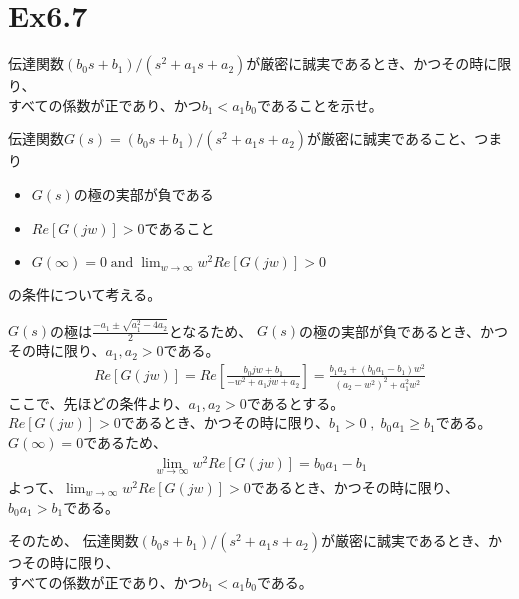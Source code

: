 \documentclass{jsarticle}
\begin{document}

\section*{Ex6.7}
伝達関数$(b_0s + b_1)/(s^2 + a_1s + a_2)$が厳密に誠実であるとき、かつその時に限り、\\
すべての係数が正であり、かつ$b_1 <a_1b_0$であることを示せ。

\vspace{1cm}
伝達関数$G(s) = (b_0s + b_1)/(s^2 + a_1s + a_2)$が厳密に誠実であること、つまり
\begin{itemize}
  \item $G(s)$の極の実部が負である
  \item $Re[G(jw)]>0$であること
  \item $G(\infty) = 0 \;\text{and}\;\lim_{w\rightarrow \infty}w^2Re[G(jw)]>0$
\end{itemize}
の条件について考える。

$G(s)$の極は$\frac{-a_1 \pm\sqrt{a_1^2-4a_2}}{2}$となるため、
$G(s)$の極の実部が負であるとき、かつその時に限り、$a_1,a_2 > 0$である。
\begin{align*}
  Re[G(jw)] = Re\left[\frac{b_0jw + b_1}{-w^2 + a_1jw + a_2}\right]=\frac{b_1a_2 + (b_0a_1 - b_1)w^2}{(a_2-w^2)^2+a_1^2w^2}
\end{align*}
ここで、先ほどの条件より、$a_1,a_2 > 0$であるとする。\\
$Re[G(jw)]>0$であるとき、かつその時に限り、$b_1>0\;,\;b_0a_1 \geq b_1$である。
$G(\infty) = 0$であるため、
\begin{align*}
  \lim_{w\rightarrow \infty}w^2Re[G(jw)]= b_0a_1-b_1 
\end{align*}
よって、$\lim_{w\rightarrow \infty}w^2Re[G(jw)]>0$であるとき、かつその時に限り、$b_0a_1 > b_1$である。

そのため、
伝達関数$(b_0s + b_1)/(s^2 + a_1s + a_2)$が厳密に誠実であるとき、かつその時に限り、\\
すべての係数が正であり、かつ$b_1 <a_1b_0$である。




\newpage
\end{document}
